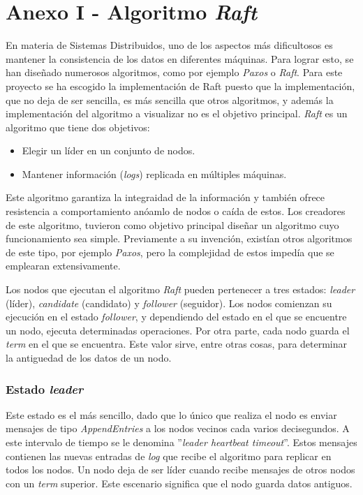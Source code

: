 \chapter*{Anexo I - Algoritmo \textit{Raft}}

En materia de Sistemas Distribuidos, uno de los aspectos más dificultosos es mantener la consistencia de los datos en diferentes máquinas. Para lograr esto, se han diseñado numerosos algoritmos, como por ejemplo \textit{Paxos}\cite{paxos} o \textit{Raft}\cite{raft1}. Para este proyecto se ha escogido la implementación de Raft puesto que la implementación, que no deja de ser sencilla, es más sencilla que otros algoritmos, y además la implementación del algoritmo a visualizar no es el objetivo principal. \textit{Raft} es un algoritmo que tiene dos objetivos:

\begin{itemize}
\item Elegir un líder en un conjunto de nodos.
\item Mantener información (\textit{logs}) replicada en múltiples máquinas.
\end{itemize}

Este algoritmo garantiza la integraidad de la información y también ofrece resistencia a comportamiento anóamlo de nodos o caída de estos. Los creadores de este algoritmo, tuvieron como objetivo principal diseñar un algoritmo cuyo funcionamiento sea simple. Previamente a su invención, existían otros algoritmos de este tipo, por ejemplo \textit{Paxos}\cite{paxos}, pero la complejidad de estos impedía que se emplearan extensivamente.

Los nodos que ejecutan el algoritmo \textit{Raft} pueden pertenecer a tres estados: \textit{leader} (líder), \textit{candidate} (candidato) y \textit{follower} (seguidor). Los nodos comienzan su ejecución en el estado \textit{follower}, y dependiendo del estado en el que se encuentre un nodo, ejecuta determinadas operaciones. Por otra parte, cada nodo guarda el \textit{term} en el que se encuentra. Este valor sirve, entre otras cosas, para determinar la antiguedad de los datos de un nodo.

\subsection*{Estado \textit{leader}}

Este estado es el más sencillo, dado que lo único que realiza el nodo es enviar mensajes de tipo \textit{AppendEntries} a los nodos vecinos cada varios decisegundos. A este intervalo de tiempo se le denomina ''\textit{leader heartbeat timeout}''. Estos mensajes contienen las nuevas entradas de \textit{log} que recibe el algoritmo para replicar en todos los nodos. Un nodo deja de ser líder cuando recibe mensajes de otros nodos con un \textit{term} superior. Este escenario significa que el nodo guarda datos antiguos.

